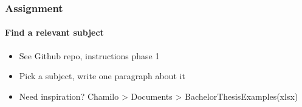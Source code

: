 \documentclass[aspectratio=169]{beamer}
\begin{document}
    \begin{frame}
        \frametitle{Assignment}
        \framesubtitle{Find a relevant subject}
        
        \begin{itemize}
            \item See Github repo, instructions phase 1
            \item Pick a subject, write one paragraph about it
            \item Need inspiration? Chamilo > Documents > BachelorThesisExamples(xlsx)
        \end{itemize}
        
    \end{frame}
    
\end{document}
